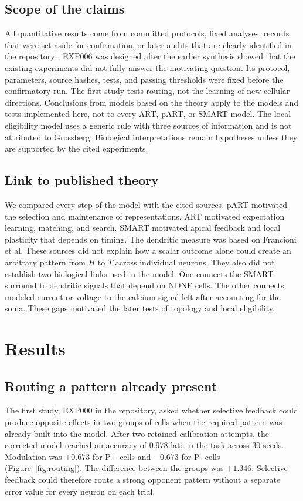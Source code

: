 \documentclass[11pt]{article}
\begin{document}
\subsection{Scope of the claims}
All quantitative results come from committed protocols, fixed analyses, records that were set aside for confirmation, or later audits that are clearly identified in the repository \citep{pvcRepo}. EXP006 was designed after the earlier synthesis showed that the existing experiments did not fully answer the motivating question. Its protocol, parameters, source hashes, tests, and passing thresholds were fixed before the confirmatory run. The first study tests routing, not the learning of new cellular directions. Conclusions from models based on the theory apply to the models and tests implemented here, not to every ART, pART, or SMART model. The local eligibility model uses a generic rule with three sources of information and is not attributed to Grossberg. Biological interpretations remain hypotheses unless they are supported by the cited experiments.

\subsection{Link to published theory}
We compared every step of the model with the cited sources. pART motivated the selection and maintenance of representations. ART motivated expectation learning, matching, and search. SMART motivated apical feedback and local plasticity that depends on timing. The dendritic measure was based on Francioni et al. These sources did not explain how a scalar outcome alone could create an arbitrary pattern from $H$ to $T$ across individual neurons. They also did not establish two biological links used in the model. One connects the SMART surround to dendritic signals that depend on NDNF cells. The other connects modeled current or voltage to the calcium signal left after accounting for the soma. These gaps motivated the later tests of topology and local eligibility.

\FloatBarrier
\section{Results}
\subsection{Routing a pattern already present}
The first study, EXP000 in the repository, asked whether selective feedback could produce opposite effects in two groups of cells when the required pattern was already built into the model. After two retained calibration attempts, the corrected model reached an accuracy of 0.978 late in the task across 30 seeds. Modulation was $+0.673$ for P+ cells and $-0.673$ for P- cells (Figure~\ref{fig:routing}). The difference between the groups was $+1.346$. Selective feedback could therefore route a strong opponent pattern without a separate error value for every neuron on each trial.
\end{document}
